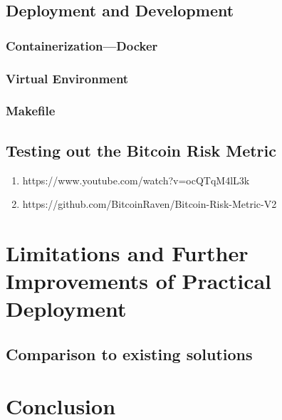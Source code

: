 \section{Deployment and Development}

\subsection*{Containerization---Docker}

\subsection*{Virtual Environment}

\subsection{Makefile}

\section{Testing out the Bitcoin Risk Metric}
\begin{enumerate}
    \item https://www.youtube.com/watch?v=ocQTqM4lL3k
    \item https://github.com/BitcoinRaven/Bitcoin-Risk-Metric-V2
\end{enumerate}

\chapter{Limitations and Further Improvements of Practical Deployment}
\label{limitations}

\section{Comparison to existing solutions}

\chapter{Conclusion}
\label{conclusion}
